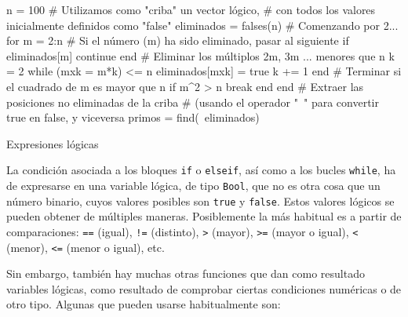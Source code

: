 ﻿\documentclass{article}
\newcommand{\code}{\texttt}
\begin{document}
n = 100
# Utilizamos como "criba" un vector lógico,
# con todos los valores inicialmente definidos como "false"
eliminados = falses(n)
# Comenzando por 2...
for m = 2:n
  # Si el número (m) ha sido eliminado, pasar al siguiente
  if eliminados[m]
    continue
  end
  # Eliminar los múltiplos 2m, 3m ... menores que n
  k = 2
  while (mxk = m*k) <= n
    eliminados[mxk] = true
    k += 1
  end
  # Terminar si el cuadrado de m es mayor que n 
  if m^2 > n
    break
  end
end
# Extraer las posiciones no eliminadas de la criba
# (usando el operador "~" para convertir true en false, y viceversa
primos = find(~eliminados)


Expresiones lógicas

La condición asociada a los bloques \code{if} o \code{elseif}, así como a los bucles \code{while}, ha de expresarse en una variable lógica, de tipo \code{Bool}, que no es otra cosa que un número binario, cuyos valores posibles son \code{true} y \code{false}. Estos valores lógicos se pueden obtener de múltiples maneras. Posiblemente la más habitual es a partir de comparaciones:
\code{==} (igual), \code{!=} (distinto),
\code{>} (mayor), \code{>=} (mayor o igual),
\code{<} (menor), \code{<=} (menor o igual), etc.

Sin embargo, también hay muchas otras funciones que dan como resultado variables lógicas, como resultado de comprobar ciertas condiciones numéricas o de otro tipo. Algunas que pueden usarse habitualmente son:
\end{document}
